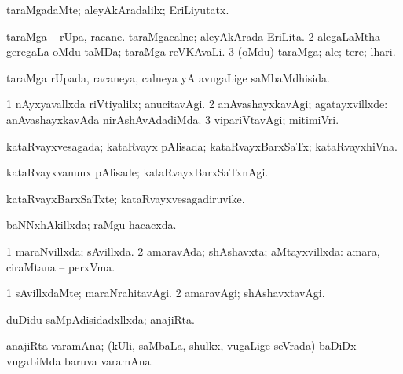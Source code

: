 {\bentry
{} 
\gl{\kirxvi}
\expl{}
\bmng
 taraMgadaMte; aleyAkAradalilx; EriLiyutatx. 
\emng
\eentry

\bentry
{} 
\gl{\nA}
\expl{}
\bmng
\bnum
{} 
\banum
{} taraMga -- rUpa, racane. 
 taraMgacalne; aleyAkArada EriLita. 
\eanum
\numie
\num{2} alegaLaMtha geregaLa oMdu taMDa; taraMga reVKAvaLi. 
\num{3} (oMdu) taraMga; ale; tere; lhari. 
\enum
\emng
\eentry

\bentry
{} 
\gl{\gu}
\expl{}
\bmng
 taraMga rUpada, racaneya, calneya yA avugaLige saMbaMdhisida. 
\emng
\eentry

\bentry
{}
\gl{\nA}
\bmng
\emng
\eentry

\bentry
{} 
\gl{\kirxvi}
\expl{}
\bmng
\bnum
\num{1} nAyxyavallxda riVtiyalilx; anucitavAgi. 
\num{2} anAvashayxkavAgi; agatayxvillxde:  anAvashayxkavAda nirAshAvAdadiMda. 
\num{3} vipariVtavAgi; mitimiVri. 
\enum
\emng
\eentry

\bentry
{} 
\gl{\gu}
\expl{}
\bmng
 kataRvayxvesagada; kataRvayx pAlisada; kataRvayxBarxSaTx; kataRvayxhiVna. 
\emng
\eentry

\bentry
{} 
\gl{\kirxvi}
\expl{}
\bmng
 kataRvayxvanunx pAlisade; kataRvayxBarxSaTxnAgi. 
\emng
\eentry

\bentry
{} 
\gl{\nA}
\expl{}
\bmng
 kataRvayxBarxSaTxte; kataRvayxvesagadiruvike. 
\emng
\eentry

\bentry
{} 
\gl{\gu}
\bmng
 baNNxhAkillxda; raMgu hacacxda. 
\emng
\eentry

\bentry
{} 
\gl{\gu}
\expl{}
\bmng
\bnum
\num{1} maraNvillxda; sAvillxda. 
\num{2} amaravAda; shAshavxta; aMtayxvillxda:  amara, ciraMtana -- perxVma. 
\enum
\emng
\eentry

\bentry
{} 
\gl{\kirxvi}
\expl{}
\bmng
\bnum
\num{1} sAvillxdaMte; maraNrahitavAgi. 
\num{2} amaravAgi; shAshavxtavAgi. 
\enum
\emng
\eentry

\bentry
{} 
\gl{\gu}
\bmng
 duDidu saMpAdisidadxllxda; anajiRta. 
\emng
\eentry

\bentry
{}
\gl{\nA}
\expl{}
\bmng
 anajiRta varamAna; (kUli, saMbaLa, shulkx, \mo vugaLige seVrada) baDiDx \mo vugaLiMda baruva varamAna. 
\emng
\eentry

}
